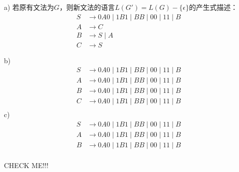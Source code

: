 \begin{solution}
a) 若原有文法为$G$，则新文法的语言$L(G')=L(G)-\{\epsilon\}$的产生式描述：
\begin{align*}
    S &\rightarrow 0A0 \mid 1B1 \mid BB \mid 00 \mid 11 \mid B\\
    A &\rightarrow C\\
    B &\rightarrow S \mid A\\
    C &\rightarrow S
\end{align*}
\end{solution}
b)
\begin{align*}
    S &\rightarrow 0A0 \mid 1B1 \mid BB \mid 00 \mid 11 \mid B\\
    A &\rightarrow 0A0 \mid 1B1 \mid BB \mid 00 \mid 11 \mid B\\
    B &\rightarrow 0A0 \mid 1B1 \mid BB \mid 00 \mid 11 \mid B\\
    C &\rightarrow 0A0 \mid 1B1 \mid BB \mid 00 \mid 11 \mid B\\
\end{align*}
c)
\begin{align*}
    S &\rightarrow 0A0 \mid 1B1 \mid BB \mid 00 \mid 11 \mid B\\
    A &\rightarrow 0A0 \mid 1B1 \mid BB \mid 00 \mid 11 \mid B\\
    B &\rightarrow 0A0 \mid 1B1 \mid BB \mid 00 \mid 11 \mid B\\
\end{align*}

CHECK ME!!!